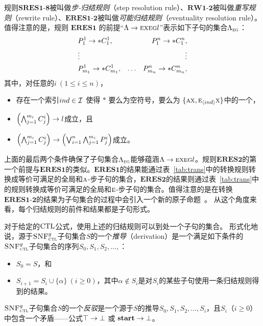 规则$\textbf{SRES1-8}$被叫做\emph{步-归结规则}（step resolution rule）、$\textbf{RW1-2}$被叫做\emph{重写规则}（rewrite rule）、$\textbf{ERES1-2}$被叫做\emph{可能归结规则}（eventuality resolution rule）。
值得注意的是，规则 $\textbf{ERES1}$ 的前提“$\Lambda \rightarrow \textsc{e} \textsc{x} \textsc{e}\textsc{g} l$”表示如下子句的集合$\Lambda_{\textsc{e}\textsc{g}}$：
\begin{align*}
	& P_1^1\rightarrow *C_1^1, & & & P_1^n\rightarrow *C_1^n,\\
	& \vdots & && \vdots\\
	& P_{m_1}^1 \rightarrow * C_{m_1}^1, & \ldots && P_{m_n}^n\rightarrow *C_{m_n}^n,
\end{align*}
其中，对任意的$i~(1\le i\le n)$，
\begin{itemize}
	\item 存在一个索引$ind \in {\cal I}$ 使得 $*$ 要么为空符号，要么为 $\{\textsc{a}\textsc{x}, \textsc{e}_{{\langle{ind}\rangle}}\textsc{x}\}$中的一个，
	\item $\left(\bigwedge_{j=1}^{m_i} C_j^i\right) \rightarrow l$成立，且
	\item $\left(\bigwedge_{j=1}^{m_i} C_j^i\right) \rightarrow \left(\bigvee_{i=1}^n\bigwedge_{j=1}^{m_i} P_j^i\right)$成立。
\end{itemize}

上面的最后两个条件确保了子句集合$\Lambda_{\textsc{e}\textsc{g}}$能够蕴涵$\Lambda \rightarrow \textsc{e} \textsc{x} \textsc{e}\textsc{g} l$。规则$\textbf{ERES2}$的第一个前提与$\textbf{ERES1}$的类似。$\textbf{ERES1}$的结果能通过表~\ref{tab:trans}中的转换规则转换成等价可满足的全局和$\textsc{a}$-步子句的集合，$\textbf{ERES2}$的结果则通过表~\ref{tab:trans}中的规则转换成等价可满足的全局和$\textsc{e}$-步子句的集合。值得注意的是在转换$\textbf{ERES1-2}$的结果为子句集合的过程中会引入一个新的原子命题~\cite{zhang2014resolution}。
从这个角度来看，每个归结规则的前件和结果都是子句形式。

对于给定的$\textrm{CTL}$公式，使用上述的归结规则可以到处一个子句的集合。
形式化地说，源于${\textsc{SNF}_{\textsc{ctl}}^g}$子句集合$S$的一个\emph{推导}（derivation）是一个满足如下条件的${\textsc{SNF}_{\textsc{ctl}}^g}$子句集合的序列$S_0, S_1, S_2, \ldots, $：
\begin{itemize}
	\item $S_0=S$，和
	\item $S_{i+1} = S_i\cup \{\alpha\}~(i\ge 0)$，其中$\alpha\notin S_i$是对$S_i$的某些子句使用一条归结规则得到的结果。
\end{itemize}

${\textsc{SNF}_{\textsc{ctl}}^g}$子句集合$S$的一个\emph{反驳}是一个源于$S$的推导$S_0, S_1, S_2, \ldots, S_i$，且$S_i$（$i\geq 0$）中包含一个矛盾——公式$\top\rightarrow\bot$ 或 $\textbf{start}\rightarrow\bot$。


